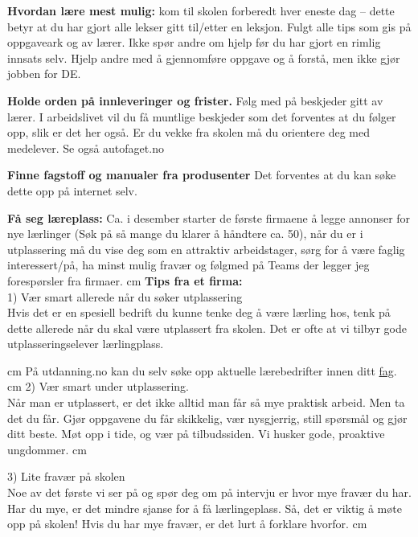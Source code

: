 \documentclass[12pt,a4paper]{article}
\begin{document}
\noindent
{\bf Hvordan lære mest mulig:} kom til skolen forberedt hver eneste dag -- dette betyr at du har gjort alle lekser gitt til/etter en leksjon. Fulgt alle tips som gis på oppgaveark og av lærer. Ikke spør andre om hjelp før du har gjort en rimlig innsats selv. Hjelp andre med å gjennomføre oppgave og å forstå, men ikke gjør jobben for DE. 
\vskip 10pt

\noindent
{\bf Holde orden på innleveringer og frister.} Følg med på beskjeder gitt av lærer. I arbeidslivet vil du få muntlige beskjeder som det forventes at du følger opp, slik er det her også. Er du vekke fra skolen må du orientere deg med medelever. Se også autofaget.no
\vskip 10pt


\noindent
{\bf Finne fagstoff og manualer fra produsenter } Det forventes at du kan søke dette opp på internet selv. 
\vskip 10pt



\noindent
{\bf Få seg læreplass:} Ca. i desember starter de første firmaene å legge annonser for nye lærlinger (Søk på så mange du klarer å håndtere ca. 50), når du er i utplassering må du vise deg som en attraktiv arbeidstager, sørg for å være faglig interessert/på, ha minst mulig fravær og følgmed på Teams der legger jeg forespørsler fra firmaer. 
 cm
{\bf Tips fra et firma:}\\ 
1) Vær smart allerede når du søker utplassering\\
Hvis det er en spesiell bedrift du kunne tenke deg å være lærling hos, tenk på dette allerede når du skal være utplassert fra skolen. Det er ofte at vi tilbyr gode utplasseringselever lærlingplass.

 cm
På utdanning.no kan du selv søke opp aktuelle lærebedrifter innen ditt \href{https://utdanning.no/finnlarebedrift/}{fag}.
 cm
2) Vær smart under utplassering. \\
Når man er utplassert, er det ikke alltid man får så mye praktisk arbeid. Men ta det du får. Gjør oppgavene du får skikkelig, vær nysgjerrig, still spørsmål og gjør ditt beste. Møt opp i tide, og vær på tilbudssiden. Vi husker gode, proaktive ungdommer.
 cm


3) Lite fravær på skolen\\
Noe av det første vi ser på og spør deg om på intervju er hvor mye fravær du har. Har du mye, er det mindre sjanse for å få lærlingeplass. Så, det er viktig å møte opp på skolen! Hvis du har mye fravær, er det lurt å forklare hvorfor.
 cm
\end{document}
